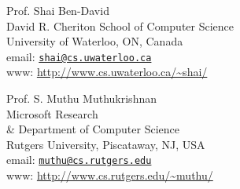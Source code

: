 \documentclass[9pt]{article}
\begin{document}
\vspace{1cm}

\noindent
\begin{minipage}[t]{9cm}
Prof. Shai Ben-David \\
David R. Cheriton School of Computer Science \\
University of Waterloo, ON, Canada \\
email: \href{mailto:shai@cs.uwaterloo.ca}{\texttt{shai@cs.uwaterloo.ca}} \\
www: \url{http://www.cs.uwaterloo.ca/~shai/}
\end{minipage}
%
\begin{minipage}[t]{9cm}
Prof. S. Muthu Muthukrishnan \\
Microsoft Research \\
\& Department of Computer Science \\
Rutgers University, Piscataway, NJ, USA \\
email: \href{mailto:muthu@cs.rutgers.edu}{\texttt{muthu@cs.rutgers.edu}} \\
www: \url{http://www.cs.rutgers.edu/~muthu/}
\end{minipage}

\renewcommand{\refname}{Publications}
\nocite{*}


\end{document}

